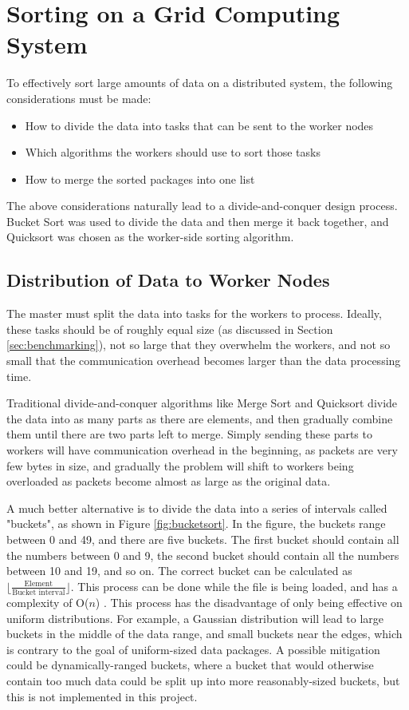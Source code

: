 \section{Sorting on a Grid Computing System}
To effectively sort large amounts of data on a distributed system, the following considerations must be made: 
\begin{itemize}
\item How to divide the data into tasks that can be sent to the worker nodes
\item Which algorithms the workers should use to sort those tasks
\item How to merge the sorted packages into one list
\end{itemize}

The above considerations naturally lead to a divide-and-conquer design process. Bucket Sort was used to divide the data and then merge it back together, and Quicksort was chosen as the worker-side sorting algorithm.

\subsection{Distribution of Data to Worker Nodes} \label{sub:modelSplitData}
The master must split the data into tasks for the workers to process. Ideally, these tasks should be of roughly equal size (as discussed in Section \ref{sec:benchmarking}), not so large that they overwhelm the workers, and not so small that the communication overhead becomes larger than the data processing time.

Traditional divide-and-conquer algorithms like Merge Sort and Quicksort divide the data into as many parts as there are elements, and then gradually combine them until there are two parts left to merge. Simply sending these parts to workers will have communication overhead in the beginning, as packets are very few bytes in size, and gradually the problem will shift to workers being overloaded as packets become almost as large as the original data. 

A much better alternative is to divide the data into a series of intervals called "buckets", as shown in Figure \ref{fig:bucketsort}. In the figure, the buckets range between 0 and 49, and there are five buckets. The first bucket should contain all the numbers between 0 and 9, the second bucket should contain all the numbers between 10 and 19, and so on. The correct bucket can be calculated as $\lfloor\frac{\text{Element}}{\text{Bucket interval}}\rfloor$. This process can be done while the file is being loaded, and has a complexity of O($n$) \cite{Introduction_to_algorithms}. This process has the disadvantage of only being effective on uniform distributions. For example, a Gaussian distribution will lead to large buckets in the middle of the data range, and small buckets near the edges, which is contrary to the goal of uniform-sized data packages. A possible mitigation could be dynamically-ranged buckets, where a bucket that would otherwise contain too much data could be split up into more reasonably-sized buckets, but this is not implemented in this project.

